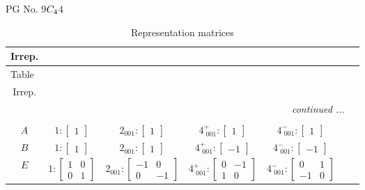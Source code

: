 \documentclass[fleqn,8pt,landscape]{jsarticle}
\begin{document}
\setcounter{MaxMatrixCols}{32}

\renewcommand{\tablename}{Table~}
\renewcommand{\figurename}{Figure~}
\begin{center}
\LARGE
PG No. 9\quad$C_{\rm 4}$\quad$4$\quad[ tetragonal ]
\end{center}
\renewcommand{\arraystretch}{1.2}
\begin{longtable}{ccccccc}
\caption{Representation matrices}
 \\
 \hline \hline
Irrep. &  &  &  &  &  &  \\ \hline \endfirsthead

\multicolumn{6}{l}{\tablename\ \thetable{}} \\
 \hline \hline
Irrep. &  &  &  &  &  &  \\ \hline \endhead

 \hline \hline
\multicolumn{6}{r}{\footnotesize\it continued ...} \\ \endfoot

 \hline \hline
\multicolumn{6}{r}{} \\ \endlastfoot

$ A $ & $ 1:\begin{bmatrix} 1 \end{bmatrix} $ & $ 2{}_{001}:\begin{bmatrix} 1 \end{bmatrix} $ & $ 4^{+}_{\,\,001}:\begin{bmatrix} 1 \end{bmatrix} $ & $ 4^{-}_{\,\,001}:\begin{bmatrix} 1 \end{bmatrix} $ \\ \hline
$ B $ & $ 1:\begin{bmatrix} 1 \end{bmatrix} $ & $ 2{}_{001}:\begin{bmatrix} 1 \end{bmatrix} $ & $ 4^{+}_{\,\,001}:\begin{bmatrix} -1 \end{bmatrix} $ & $ 4^{-}_{\,\,001}:\begin{bmatrix} -1 \end{bmatrix} $ \\ \hline
$ E $ & $ 1:\begin{bmatrix} 1 & 0 \\ 0 & 1 \end{bmatrix} $ & $ 2{}_{001}:\begin{bmatrix} -1 & 0 \\ 0 & -1 \end{bmatrix} $ & $ 4^{+}_{\,\,001}:\begin{bmatrix} 0 & -1 \\ 1 & 0 \end{bmatrix} $ & $ 4^{-}_{\,\,001}:\begin{bmatrix} 0 & 1 \\ -1 & 0 \end{bmatrix} $ \\
\end{longtable}
\end{document}

